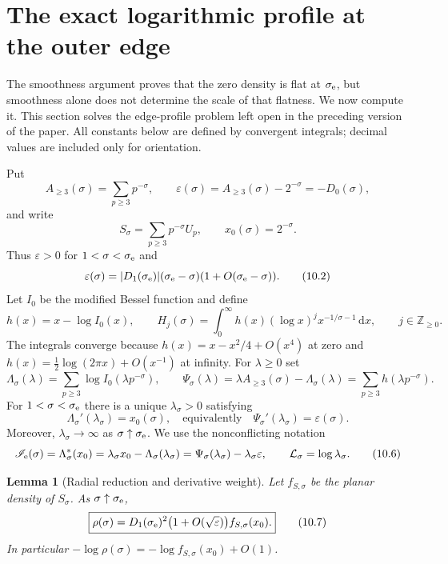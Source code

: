 \documentclass[11pt]{article}
\newtheorem{lemma}[theorem]{Lemma}
\theoremstyle{definition}
\theoremstyle{remark}
\newcommand{\dd}{\,\mathrm d}
\newcommand{\eps}{\varepsilon}
\begin{document}
\section{The exact logarithmic profile at the outer edge}
\label{sec:exact-edge-profile}

The smoothness argument proves that the zero density is flat at
$\sigma_{\rm e}$, but smoothness alone does not determine the scale of that
flatness.  We now compute it.  This section solves the edge-profile problem left
open in the preceding version of the paper.  All constants below are defined by
convergent integrals; decimal values are included only for orientation.

Put
\[
 A_{\ge3}(\sigma)=\sum_{p\ge3}p^{-\sigma},\qquad
 \eps(\sigma)=A_{\ge3}(\sigma)-2^{-\sigma}=-D_0(\sigma),
\tag{10.1}
\]
and write
\[
 S_\sigma=\sum_{p\ge3}p^{-\sigma}U_p,\qquad x_0(\sigma)=2^{-\sigma}.
\]
Thus $\eps>0$ for $1<\sigma<\sigma_{\rm e}$ and
\[
 \eps(\sigma)=|D_1(\sigma_{\rm e})|
 (\sigma_{\rm e}-\sigma)(1+O(\sigma_{\rm e}-\sigma)).
\tag{10.2}
\]
Let $I_0$ be the modified Bessel function and define
\[
 h(x)=x-\log I_0(x),\qquad
 H_j(\sigma)=\int_0^\infty h(x)(\log x)^j x^{-1/\sigma-1}\dd x,
 \qquad j\in\mathbb Z_{\ge0}.
\tag{10.3}
\]
The integrals converge because
$h(x)=x-x^2/4+O(x^4)$ at zero and
$h(x)=\tfrac12\log(2\pi x)+O(x^{-1})$ at infinity.
For $\lambda\ge0$ set
\[
 \Lambda_\sigma(\lambda)=\sum_{p\ge3}\log I_0(\lambda p^{-\sigma}),
 \qquad
 \Psi_\sigma(\lambda)=\lambda A_{\ge3}(\sigma)-\Lambda_\sigma(\lambda)
 =\sum_{p\ge3}h(\lambda p^{-\sigma}).
\tag{10.4}
\]
For $1<\sigma<\sigma_{\rm e}$ there is a unique $\lambda_\sigma>0$ satisfying
\[
 \Lambda_\sigma'(\lambda_\sigma)=x_0(\sigma),
 \quad\text{equivalently}\quad
 \Psi_\sigma'(\lambda_\sigma)=\eps(\sigma).
\tag{10.5}
\]
Moreover, $\lambda_\sigma\to\infty$ as $\sigma\uparrow\sigma_{\rm e}$.
We use the nonconflicting notation
\[
 \mathscr I_{\rm e}(\sigma)
 =\Lambda_\sigma^*(x_0)
 =\lambda_\sigma x_0-\Lambda_\sigma(\lambda_\sigma)
 =\Psi_\sigma(\lambda_\sigma)-\lambda_\sigma\eps,
 \qquad \mathcal L_\sigma=\log\lambda_\sigma.
\tag{10.6}
\]

\begin{lemma}[Radial reduction and derivative weight]
\label{lem:edge-radial-reduction}
Let $f_{S,\sigma}$ be the planar density of $S_\sigma$.  As
$\sigma\uparrow\sigma_{\rm e}$,
\[
 \boxed{
 \rho(\sigma)=D_1(\sigma_{\rm e})^2
  \bigl(1+O(\sqrt\eps)\bigr)f_{S,\sigma}(x_0).}
\tag{10.7}
\]
In particular $-\log\rho(\sigma)=-\log f_{S,\sigma}(x_0)+O(1)$.
\end{lemma}
\end{document}
